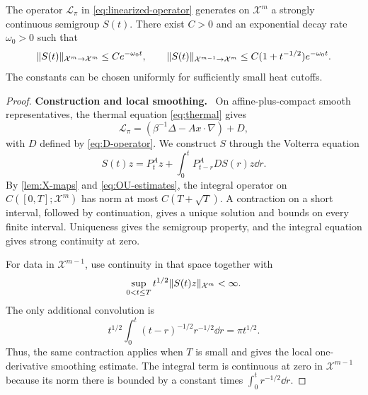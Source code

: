 \documentclass[11pt,reqno]{amsart}
\numberwithin{equation}{section}
\theoremstyle{plain}
\theoremstyle{remark}
\DeclarePairedDelimiter{\norm}{\lVert}{\rVert}
\newcommand{\parheading}[1]{\par\medskip\noindent\textbf{#1}\ }
\newcommand{\Xspace}{\mathcal X}
\begin{document}
\begin{lemma}\label{lem:linear-X}
The operator $\mathcal L_\pi$ in \eqref{eq:linearized-operator} generates on $\Xspace^m$ a strongly continuous semigroup $S(t)$. There exist $C>0$ and an exponential decay rate $\omega_0>0$ such that
\begin{equation}\label{eq:S-X}
 \norm{S(t)}_{\Xspace^m\to\Xspace^m}\le C e^{-\omega_0t},\qquad
 \norm{S(t)}_{\Xspace^{m-1}\to\Xspace^m}
       \le C(1+t^{-1/2})e^{-\omega_0t}.
\end{equation}
The constants can be chosen uniformly for sufficiently small heat cutoffs.
\end{lemma}
\begin{proof}
\parheading{Construction and local smoothing.}
On affine-plus-compact smooth representatives, the thermal equation \eqref{eq:thermal} gives
\begin{equation}\label{eq:linear-OU-decomposition}
 \mathcal L_\pi=(\beta^{-1}\Delta-Ax\cdot\nabla)+D,
\end{equation}
with $D$ defined by \eqref{eq:D-operator}. We construct $S$ through the Volterra equation
\begin{equation}\label{eq:S-volterra}
 S(t)z=P_t^Az+\int_0^tP_{t-r}^A D S(r)z\dd r.
\end{equation}
By \cref{lem:X-maps} and \eqref{eq:OU-estimates}, the integral operator on $C([0,T];\Xspace^m)$ has norm at most $C(T+\sqrt T)$. A contraction on a short interval, followed by continuation, gives a unique solution and bounds on every finite interval. Uniqueness gives the semigroup property, and the integral equation gives strong continuity at zero.

For data in $\Xspace^{m-1}$, use continuity in that space together with
\begin{equation}\label{eq:local-smoothing-norm}
 \sup_{0<t\le T}t^{1/2}\norm{S(t)z}_{\Xspace^m}<\infty.
\end{equation}
The only additional convolution is
\begin{equation}\label{eq:smoothing-convolution}
 t^{1/2}\int_0^t(t-r)^{-1/2}r^{-1/2}\dd r=\pi t^{1/2}.
\end{equation}
Thus, the same contraction applies when $T$ is small and gives the local one-derivative smoothing estimate. The integral term is continuous at zero in $\Xspace^{m-1}$ because its norm there is bounded by a constant times $\int_0^t r^{-1/2}\dd r$.


\end{proof}
\end{document}

